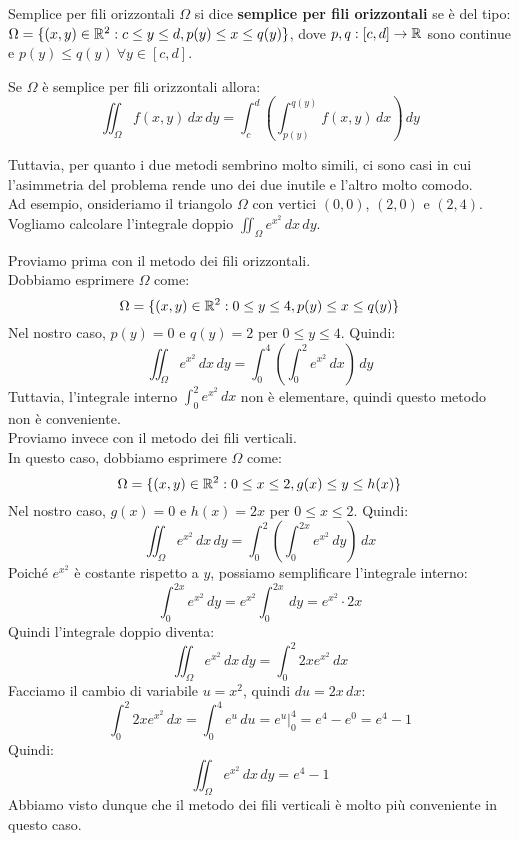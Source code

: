 \begin{definizione}{Semplice per fili orizzontali}
  $\Omega$ si dice \textbf{semplice per fili orizzontali} se è del tipo: $\Omega = \{ (x,y) \in \mathbb{R}^2 : c \leq y \leq d, p(y) \leq x \leq q(y) \}$, dove $p,q:[c,d] \rightarrow \mathbb{R}$ sono continue e $p(y) \leq q(y) \ \forall y \in [c,d]$.
\end{definizione}

Se $\Omega$ è semplice per fili orizzontali allora:
\[
\iint_{\Omega} f(x,y) \, dx \, dy = \int_{c}^{d} \left( \int_{p(y)}^{q(y)} f(x,y) \, dx \right) \, dy
\]

Tuttavia, per quanto i due metodi sembrino molto simili, ci sono casi in cui l'asimmetria del problema rende uno dei due inutile e l'altro molto comodo.\\


Ad esempio, onsideriamo il triangolo $\Omega$ con vertici $(0,0)$, $(2,0)$ e $(2,4)$. Vogliamo calcolare l'integrale doppio $\iint_{\Omega} e^{x^2} \, dx \, dy$.

Proviamo prima con il metodo dei fili orizzontali.\\
Dobbiamo esprimere $\Omega$ come:
\[
\Omega = \{ (x,y) \in \mathbb{R}^2 : 0 \leq y \leq 4, p(y) \leq x \leq q(y) \}
\]
Nel nostro caso, $p(y) = 0$ e $q(y) = 2$ per $0 \leq y \leq 4$. Quindi:
\[
\iint_{\Omega} e^{x^2} \, dx \, dy = \int_{0}^{4} \left( \int_{0}^{2} e^{x^2} \, dx \right) \, dy
\]
Tuttavia, l'integrale interno $\int_{0}^{2} e^{x^2} \, dx$ non è elementare, quindi questo metodo non è conveniente.\\

Proviamo invece con il metodo dei fili verticali.\\
In questo caso, dobbiamo esprimere $\Omega$ come:
\[
\Omega = \{ (x,y) \in \mathbb{R}^2 : 0 \leq x \leq 2, g(x) \leq y \leq h(x) \}
\]
Nel nostro caso, $g(x) = 0$ e $h(x) = 2x$ per $0 \leq x \leq 2$. Quindi:
\[
\iint_{\Omega} e^{x^2} \, dx \, dy = \int_{0}^{2} \left( \int_{0}^{2x} e^{x^2} \, dy \right) \, dx
\]
Poiché $e^{x^2}$ è costante rispetto a $y$, possiamo semplificare l'integrale interno:
\[
\int_{0}^{2x} e^{x^2} \, dy = e^{x^2} \int_{0}^{2x} \, dy = e^{x^2} \cdot 2x
\]
Quindi l'integrale doppio diventa:
\[
\iint_{\Omega} e^{x^2} \, dx \, dy = \int_{0}^{2} 2x e^{x^2} \, dx
\]
Facciamo il cambio di variabile $u = x^2$, quindi $du = 2x \, dx$:
\[
\int_{0}^{2} 2x e^{x^2} \, dx = \int_{0}^{4} e^u \, du = e^u \bigg|_{0}^{4} = e^4 - e^0 = e^4 - 1
\]
Quindi:
\[
\iint_{\Omega} e^{x^2} \, dx \, dy = e^4 - 1
\]
Abbiamo visto dunque che il metodo dei fili verticali è molto più conveniente in questo caso.

